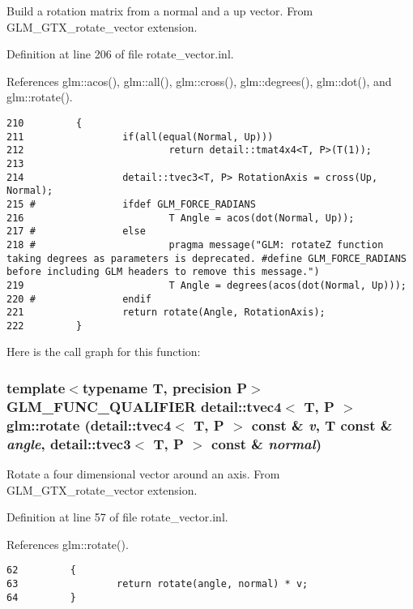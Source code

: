 Build a rotation matrix from a normal and a up vector. From GLM\_\-GTX\_\-rotate\_\-vector extension. 

Definition at line 206 of file rotate\_\-vector.inl.

References glm::acos(), glm::all(), glm::cross(), glm::degrees(), glm::dot(), and glm::rotate().

\begin{Code}\begin{verbatim}210         {
211                 if(all(equal(Normal, Up)))
212                         return detail::tmat4x4<T, P>(T(1));
213 
214                 detail::tvec3<T, P> RotationAxis = cross(Up, Normal);
215 #               ifdef GLM_FORCE_RADIANS
216                         T Angle = acos(dot(Normal, Up));
217 #               else
218 #                       pragma message("GLM: rotateZ function taking degrees as parameters is deprecated. #define GLM_FORCE_RADIANS before including GLM headers to remove this message.")
219                         T Angle = degrees(acos(dot(Normal, Up)));
220 #               endif
221                 return rotate(Angle, RotationAxis);
222         }
\end{verbatim}
\end{Code}




Here is the call graph for this function:\hypertarget{group__gtx__rotate__vector_ga787e2132208a47efe58640ac7de9509}{
\subsubsection[rotate]{\setlength{\rightskip}{0pt plus 5cm}template$<$typename T, precision P$>$ GLM\_\-FUNC\_\-QUALIFIER detail::tvec4$<$ T, P $>$ glm::rotate (detail::tvec4$<$ T, P $>$ const \& {\em v}, \/  T const \& {\em angle}, \/  detail::tvec3$<$ T, P $>$ const \& {\em normal})}}
\label{group__gtx__rotate__vector_ga787e2132208a47efe58640ac7de9509}


Rotate a four dimensional vector around an axis. From GLM\_\-GTX\_\-rotate\_\-vector extension. 

Definition at line 57 of file rotate\_\-vector.inl.

References glm::rotate().

\begin{Code}\begin{verbatim}62         {
63                 return rotate(angle, normal) * v;
64         }
\end{verbatim}
\end{Code}




